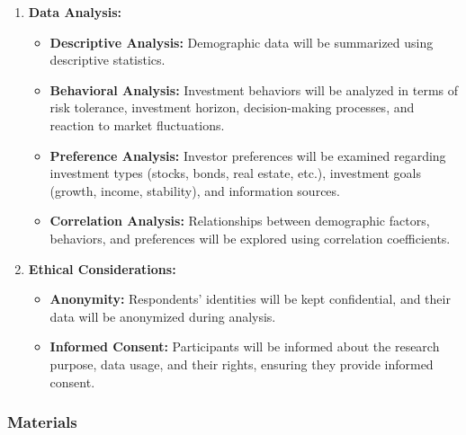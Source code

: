 \begin{enumerate}
    \item \textbf{Data Analysis:}
    \begin{itemize}
        \item \textbf{Descriptive Analysis:} Demographic data will be summarized using descriptive statistics.
        \item \textbf{Behavioral Analysis:} Investment behaviors will be analyzed in terms of risk tolerance, investment horizon, decision-making processes, and reaction to market fluctuations.
        \item \textbf{Preference Analysis:} Investor preferences will be examined regarding investment types (stocks, bonds, real estate, etc.), investment goals (growth, income, stability), and information sources.
        \item \textbf{Correlation Analysis:} Relationships between demographic factors, behaviors, and preferences will be explored using correlation coefficients.
    \end{itemize}

    \item \textbf{Ethical Considerations:}
    \begin{itemize}
        \item \textbf{Anonymity:} Respondents' identities will be kept confidential, and their data will be anonymized during analysis.
        \item \textbf{Informed Consent:} Participants will be informed about the research purpose, data usage, and their rights, ensuring they provide informed consent.
    \end{itemize}
\end{enumerate}

\subsubsection{Materials}

